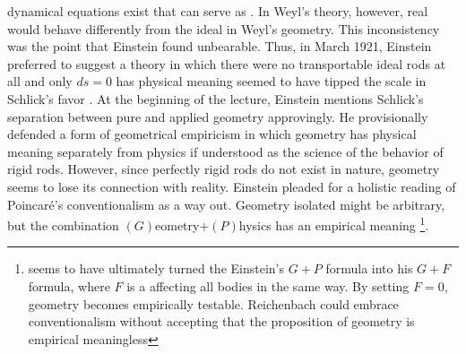 \documentclass[draft]{article}
\newcommand{\WT}{Weyl's theory\xspace}
\newcommand{\WG}{Weyl's geometry\xspace}
\begin{document}
{dynamical equations exist that can serve as \rac. In \WT, however, real \rac would behave differently from the ideal \rac in \WG. This inconsistency was the point that Einstein found unbearable. Thus, in March 1921, Einstein preferred to suggest a theory in which there were no transportable ideal rods at all and only $ds=0$ has physical meaning \citep{Einstein1921c}} seemed to have tipped the scale in Schlick's favor \citep[5]{Reichenbach1921a}. At the beginning of the lecture, Einstein mentions Schlick's separation between pure and applied geometry approvingly. He provisionally defended a form of geometrical empiricism in which geometry has physical meaning separately from physics if understood as the science of the behavior of rigid rods. However, since perfectly rigid rods do not exist in nature, geometry seems to lose its connection with reality. Einstein pleaded for a holistic reading of Poincaré's conventionalism as a way out. Geometry isolated might be arbitrary, but the combination $(G)$eometry+$(P)$hysics has an empirical meaning \citep[5]{Reichenbach1921a}\footnote{\citet{Reichenbach1922a} seems to have ultimately turned the Einstein's $G+P$ formula into his $G + F$ formula, where $F$ is a  affecting all bodies in the same way. By setting $F=0$, geometry becomes empirically testable. Reichenbach could embrace conventionalism without accepting that the proposition of geometry is empirical meaningless}.










\end{document}
